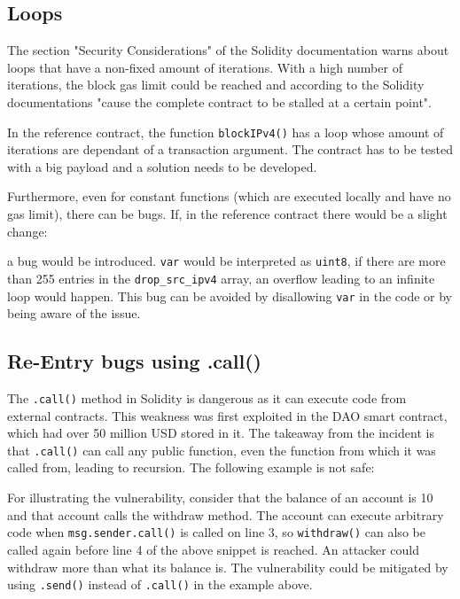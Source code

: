 \subsection{Loops}
The section "Security Considerations" of the Solidity documentation warns about loops that have a non-fixed amount of iterations. With a high number of iterations, the block gas limit could be reached and according to the Solidity documentations "cause the complete contract to be stalled at a certain point".

In the reference contract, the function \texttt{blockIPv4()} has a loop whose amount of iterations are dependant of a transaction argument. The contract has to be tested with a big payload and a solution needs to be developed.

Furthermore, even for constant functions (which are executed locally and have no gas limit), there can be bugs. If, in the reference contract there would be a slight change:



a bug would be introduced. \texttt{var} would be interpreted as \texttt{uint8}, if there are more than 255 entries in the \texttt{drop\_src\_ipv4} array, an overflow leading to an infinite loop would happen.
This bug can be avoided by disallowing \texttt{var} in the code or by being aware of the issue.

\subsection{Re-Entry bugs using .call()}

The \texttt{.call()} method in Solidity is dangerous as it can execute code from external contracts. This weakness was first exploited in the DAO smart contract, which had over 50 million USD stored in it. The takeaway from the incident is that \texttt{.call()} can call any public function, even the function from which it was called from, leading to recursion.
The following example is not safe:



For illustrating the vulnerability, consider that the balance of an account is 10 and that account calls the withdraw method. The account can execute arbitrary code when \texttt{msg.sender.call()} is called on line 3, so \texttt{withdraw()} can also be called again before line 4 of the above snippet is reached. An attacker could withdraw more than what its balance is. The vulnerability could be mitigated by using \texttt{.send()} instead of \texttt{.call()} in the example above.

